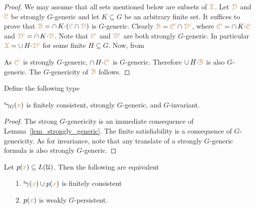 \begin{proof}
  We may assume that all sets mentioned below are subsets of ${\color{brown}\EuScript X}$.
  Let ${\color{brown}\EuScript D}$ and ${\color{brown}\EuScript C}$ be strongly $G$-generic and let $K\subseteq G$ be an arbitrary finite set.
  It suffices to prove that ${\color{brown}\EuScript B}=\cap\, K{\cdot}({\color{brown}\EuScript C}\cap{\color{brown}\EuScript D})$ is $G$-generic. 
  Clearly ${\color{brown}\EuScript B}={\color{brown}\EuScript C'}\cap{\color{brown}\EuScript D'}$, where ${\color{brown}\EuScript C'}=\cap\, K{\cdot}{\color{brown}\EuScript C}$ and ${\color{brown}\EuScript D'}=\cap\, K{\cdot}{\color{brown}\EuScript D}$.
  Note that ${\color{brown}\EuScript C'}$ and ${\color{brown}\EuScript D'}$ are both strongly $G$-generic.
  In particular ${\color{brown}\EuScript X}=\cup\,H{\cdot}\color{brown}\EuScript D'$ for some finite $H\subseteq G$.
  Now, from
  

  
  
  
  As ${\color{brown}\EuScript C'}$ is strongly $G$-generic, $\cap\, H{\cdot}{\color{brown}\EuScript C'}$ is $G$-generic.
  Therefore $\cup\,H{\cdot}{\color{brown}\EuScript B}$ is also $G$-generic.
  The $G$-genericity of ${\color{brown}\EuScript B}$ follows.
\end{proof}

Define the following type


\begin{corollary}\label{corol_str_gen}
  ${}^{\rm s}\kern-.2ex\gamma_G({\color{brown} x})$ is finitely consistent, strongly $G$-generic, and $G$-invariant.
\end{corollary}

\begin{proof}
  The strong $G$-genericity is an immediate consequence of Lemma~\ref{lem_strongly_generic}.
  The finite satisfiability is a consequence of $G$-genericity.%
  As for invariance, note that any translate of a strongly $G$-generic formula is also strongly $G$-generic.
\end{proof}

\begin{corollary}\label{corol_q_w_pers}
  Let $p({\color{brown} x})\subseteq L(\EuScript U)$.
  Then the following are equivalent
  \begin{itemize}
    \item [1.] ${}^{\rm s}\kern-.2ex\gamma({\color{brown} x})\cup p({\color{brown} x})$ is finitely consistent
    \item [2.] $p({\color{brown} x})$ is weakly $G$-persistent.
  \end{itemize}
\end{corollary}

